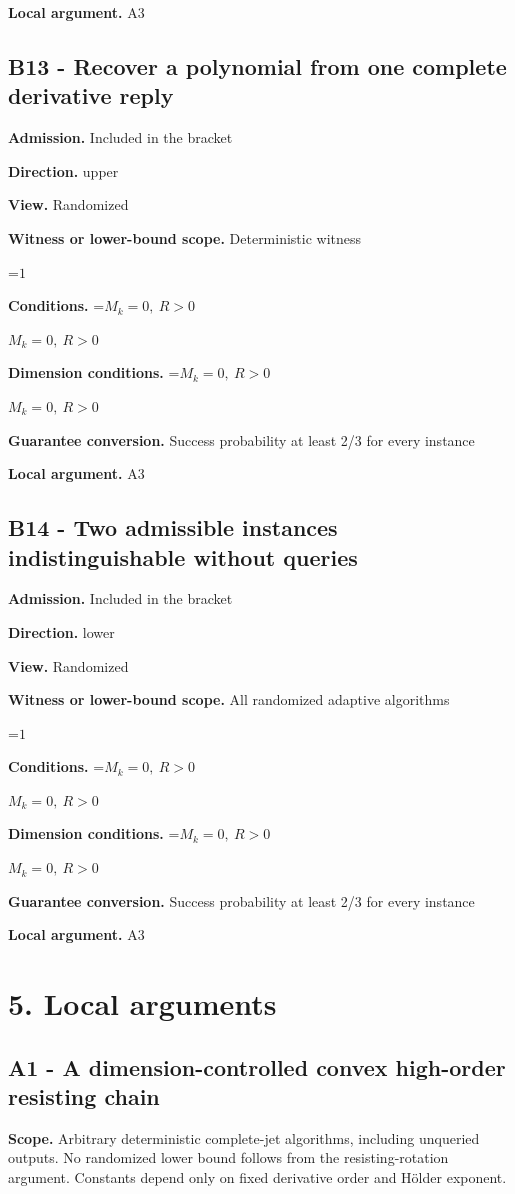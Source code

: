 \documentclass[10pt,a4paper]{article}
\newcommand{\AtlasMath}[1]{\par\begingroup\centering\setbox0=\hbox{$\displaystyle #1$}\ifdim\wd0>1.4\linewidth\typeout{ATLAS WIDE FORMULA: \the\wd0}\fi\ifdim\wd0>\linewidth\resizebox{\linewidth}{!}{\box0}\else\box0\fi\par\endgroup}
\newcommand{\AtlasInlineMath}[1]{\begingroup\setbox0=\hbox{$#1$}\ifdim\wd0>.4\linewidth\endgroup\AtlasMath{#1}\else\endgroup$#1$\fi}
\begin{document}
\textbf{Local argument.} A3

\subsection{B13 - Recover a polynomial from one complete derivative reply}
\textbf{Admission.} Included in the bracket

\textbf{Direction.} upper

\textbf{View.} Randomized

\textbf{Witness or lower-bound scope.} Deterministic witness

\AtlasMath{1}
\textbf{Conditions.} \AtlasInlineMath{M_k=0,\ R>0}

\textbf{Dimension conditions.} \AtlasInlineMath{M_k=0,\ R>0}

\textbf{Guarantee conversion.} Success probability at least 2/3 for every instance

\textbf{Local argument.} A3

\subsection{B14 - Two admissible instances indistinguishable without queries}
\textbf{Admission.} Included in the bracket

\textbf{Direction.} lower

\textbf{View.} Randomized

\textbf{Witness or lower-bound scope.} All randomized adaptive algorithms

\AtlasMath{1}
\textbf{Conditions.} \AtlasInlineMath{M_k=0,\ R>0}

\textbf{Dimension conditions.} \AtlasInlineMath{M_k=0,\ R>0}

\textbf{Guarantee conversion.} Success probability at least 2/3 for every instance

\textbf{Local argument.} A3

\section{5. Local arguments}
\subsection{A1 - A dimension-controlled convex high-order resisting chain}
\textbf{Scope.} Arbitrary deterministic complete-jet algorithms, including unqueried outputs. No randomized lower bound follows from the resisting-rotation argument. Constants depend only on fixed derivative order and Hölder exponent.
\end{document}
